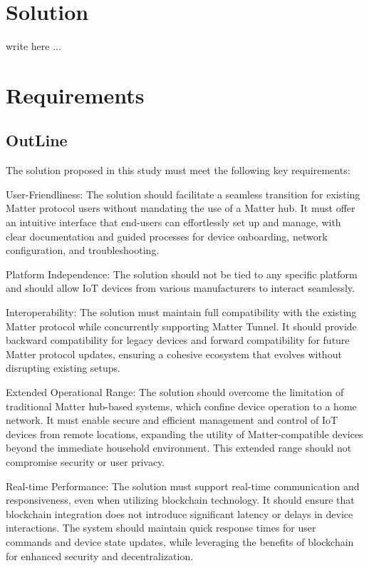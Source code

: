 \documentclass[conference]{IEEEtran}
\begin{document}
\section{Solution}

write here ...

\section{Requirements}

\subsection{OutLine}
The solution proposed in this study must meet the following key requirements:

User-Friendliness: The solution should facilitate a seamless transition for existing Matter protocol users without mandating the use of a Matter hub. It must offer an intuitive interface that end-users can effortlessly set up and manage, with clear documentation and guided processes for device onboarding, network configuration, and troubleshooting.

Platform Independence: The solution should not be tied to any specific platform and should allow IoT devices from various manufacturers to interact seamlessly.

Interoperability: The solution must maintain full compatibility with the existing Matter protocol while concurrently supporting Matter Tunnel. It should provide backward compatibility for legacy devices and forward compatibility for future Matter protocol updates, ensuring a cohesive ecosystem that evolves without disrupting existing setups.

Extended Operational Range: The solution should overcome the limitation of traditional Matter hub-based systems, which confine device operation to a home network. It must enable secure and efficient management and control of IoT devices from remote locations, expanding the utility of Matter-compatible devices beyond the immediate household environment. This extended range should not compromise security or user privacy.

Real-time Performance: The solution must support real-time communication and responsiveness, even when utilizing blockchain technology. It should ensure that blockchain integration does not introduce significant latency or delays in device interactions. The system should maintain quick response times for user commands and device state updates, while leveraging the benefits of blockchain for enhanced security and decentralization.
\end{document}
